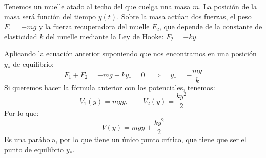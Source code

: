 \begin{ejemplo}
    Tenemos un muelle atado al techo del que cuelga una masa $m$. La posición de la masa será función del tiempo $y(t)$. Sobre la masa actúan dos fuerzas, el peso $F_1 = -mg$ y la fuerza recuperadora del muelle $F_2$, que depende de la constante de elasticidad $k$ del muelle mediante la Ley de Hooke: $F_2 = -ky$. 
    
    \begin{figure}[H]
        \centering
    \end{figure}

    \noindent
    Aplicando la ecuación anterior suponiendo que nos encontramos en una posición $y_\ast$ de equilibrio:
    \begin{equation*}
        F_1 + F_2 = -mg -ky_\ast = 0 \quad\Longrightarrow\quad y_\ast = -\frac{mg}{k}
    \end{equation*}
    Si queremos hacer la fórmula anterior con los potenciales, tenemos:
    \begin{equation*}
        V_1(y) = mgy, \qquad V_2(y) = \frac{ky^2}{2}
    \end{equation*}
    Por lo que:
    \begin{equation*}
        V(y) = mgy + \frac{ky^2}{2}
    \end{equation*}
    Es una parábola, por lo que tiene un único punto crítico, que tiene que ser el punto de equilibrio $y_\ast$.
\end{ejemplo}

